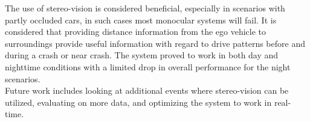 The use of stereo-vision is considered beneficial, especially in scenarios with partly occluded cars, in such cases most monocular systems will fail. It is considered that providing distance information from the ego vehicle to surroundings provide useful information with regard to drive patterns before and during a crash or near crash. The system proved to work in both day and nighttime conditions with a limited drop in overall performance for the night scenarios.\\
Future work includes looking at additional events where stereo-vision can be utilized, evaluating on more data, and optimizing the system to work in real-time.

